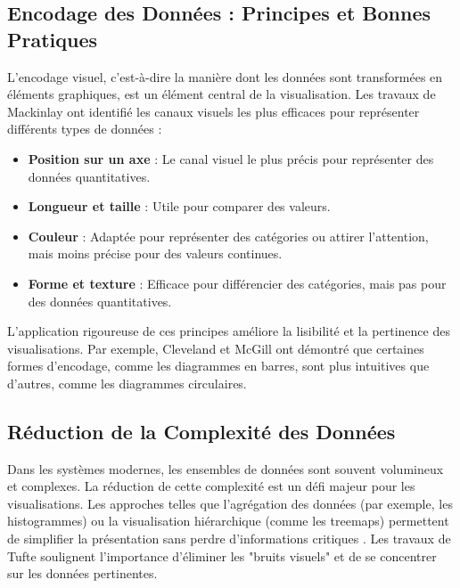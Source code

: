 \documentclass[runningheads]{llncs}
\begin{document}
\subsection{Encodage des Données : Principes et Bonnes Pratiques}
L'encodage visuel, c'est-à-dire la manière dont les données sont transformées en éléments graphiques, est un élément central de la visualisation. Les travaux de Mackinlay \cite{mackinlay_automating_1986} ont identifié les canaux visuels les plus efficaces pour représenter différents types de données :
\begin{itemize}
    \item \textbf{Position sur un axe} : Le canal visuel le plus précis pour représenter des données quantitatives.
    \item \textbf{Longueur et taille} : Utile pour comparer des valeurs.
    \item \textbf{Couleur} : Adaptée pour représenter des catégories ou attirer l’attention, mais moins précise pour des valeurs continues.
    \item \textbf{Forme et texture} : Efficace pour différencier des catégories, mais pas pour des données quantitatives.
\end{itemize}

L'application rigoureuse de ces principes améliore la lisibilité et la pertinence des visualisations. Par exemple, Cleveland et McGill \cite{cleveland_graphical_1984} ont démontré que certaines formes d'encodage, comme les diagrammes en barres, sont plus intuitives que d'autres, comme les diagrammes circulaires.

\subsection{Réduction de la Complexité des Données}
Dans les systèmes modernes, les ensembles de données sont souvent volumineux et complexes. La réduction de cette complexité est un défi majeur pour les visualisations. Les approches telles que l'agrégation des données (par exemple, les histogrammes) ou la visualisation hiérarchique (comme les treemaps) permettent de simplifier la présentation sans perdre d'informations critiques \cite{johnson_hierarchical_1991}. Les travaux de Tufte \cite{tufte_visual_2001} soulignent l’importance d’éliminer les "bruits visuels" et de se concentrer sur les données pertinentes.
\end{document}

